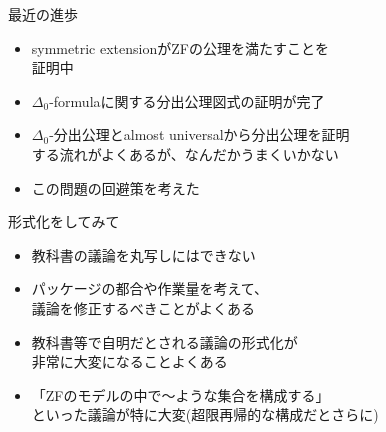 \documentclass[17pt,aspectratio=169,xcolor=dvipsnames,table,dvipdfmx]{beamer}
\theoremstyle{definition}
\begin{document}
\begin{frame} {最近の進歩}
    \begin{itemize}
        \item symmetric extensionがZFの公理を満たすことを\\証明中
        \item $\Delta_0$-formulaに関する分出公理図式の証明が完了
        \item $\Delta_0$-分出公理とalmost universalから分出公理を証明\\
              する流れがよくあるが、なんだかうまくいかない
        \item この問題の回避策を考えた
    \end{itemize}
\end{frame}

\begin{frame} {形式化をしてみて}
    \begin{itemize}
        \item 教科書の議論を丸写しにはできない
        \item パッケージの都合や作業量を考えて、\\議論を修正するべきことがよくある
        \item 教科書等で自明だとされる議論の形式化が\\非常に大変になることよくある
        \item 「ZFのモデルの中で～ような集合を構成する」\\といった議論が特に大変{\small (超限再帰的な構成だとさらに)}
    \end{itemize}
\end{frame}
\end{document}

